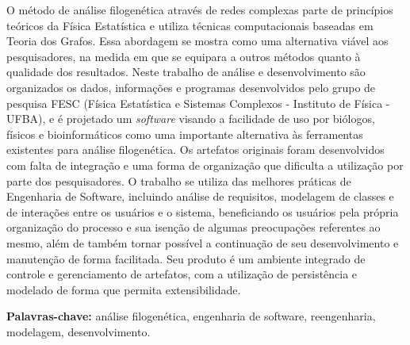 \documentclass[normaltoc,capchap,capsec,times]{abnt}
\begin{document}



\begin{resumo}
O método de análise filogenética através de redes complexas parte de princípios teóricos da Física Estatística e utiliza técnicas computacionais
baseadas em Teoria dos Grafos. Essa abordagem se mostra como uma alternativa viável aos pesquisadores, na medida em que se equipara a outros métodos
quanto à qualidade dos resultados. Neste trabalho de análise e desenvolvimento são organizados os dados, informações e programas desenvolvidos pelo grupo
de pesquisa FESC (Física Estatística e Sistemas Complexos - Instituto de Física - UFBA), e é projetado um \textit{software} visando a facilidade de uso
por biólogos, físicos e bioinformáticos como uma importante alternativa às ferramentas existentes para análise filogenética. Os artefatos originais foram
desenvolvidos com falta de integração e uma forma de organização que dificulta a utilização por parte dos pesquisadores. O trabalho se utiliza das melhores
práticas de Engenharia de Software, incluindo análise de requisitos, modelagem de classes e de interações entre os usuários e o sistema, beneficiando os
usuários pela própria organização do processo e sua isenção de algumas preocupações referentes ao mesmo, além de também tornar possível a continuação
de seu desenvolvimento e manutenção de forma facilitada. Seu produto é um ambiente integrado de controle e gerenciamento de artefatos, com a utilização de
persistência e modelado de forma que permita extensibilidade.


\textbf{Palavras-chave:}
análise filogenética,
engenharia de software, 
reengenharia,
modelagem,
desenvolvimento.
\end{resumo}
\end{document}
